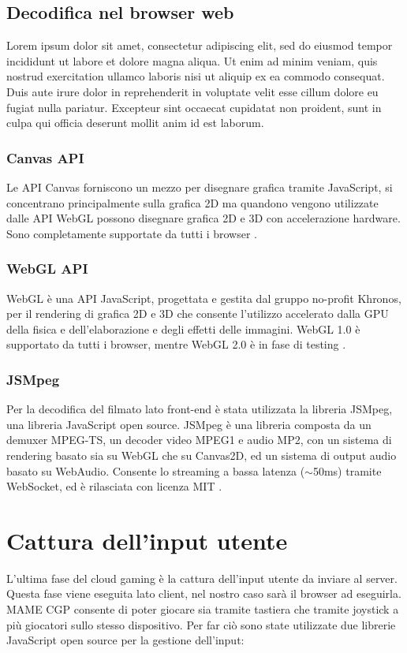 \subsection{Decodifica nel browser web}
Lorem ipsum dolor sit amet, consectetur adipiscing elit, sed do eiusmod tempor incididunt ut labore et dolore magna aliqua. Ut enim ad minim veniam, quis nostrud exercitation ullamco laboris nisi ut aliquip ex ea commodo consequat. Duis aute irure dolor in reprehenderit in voluptate velit esse cillum dolore eu fugiat nulla pariatur. Excepteur sint occaecat cupidatat non proident, sunt in culpa qui officia deserunt mollit anim id est laborum.

\subsubsection{Canvas API}
Le API Canvas forniscono un mezzo per disegnare grafica tramite JavaScript, si concentrano principalmente sulla grafica 2D ma quandono vengono utilizzate dalle API WebGL possono disegnare grafica 2D e 3D con accelerazione hardware. Sono completamente supportate da tutti i browser \parencite{Canvas_API}.

\subsubsection{WebGL API}
WebGL è una API JavaScript, progettata e gestita dal gruppo no-profit Khronos, per il rendering di grafica 2D e 3D che consente l'utilizzo accelerato dalla GPU della fisica e dell'elaborazione e degli effetti delle immagini. WebGL 1.0 è supportato da tutti i browser, mentre WebGL 2.0 è in fase di testing \parencite{WebGL}.

\subsubsection{JSMpeg} \label{subsec:cap3_JSMpeg}
Per la decodifica del filmato lato front-end è stata utilizzata la libreria JSMpeg, una libreria JavaScript open source. JSMpeg è una libreria composta da un demuxer MPEG-TS, un decoder video MPEG1 e audio MP2, con un sistema di rendering basato sia su WebGL che su Canvas2D, ed un sistema di output audio basato su WebAudio. Consente lo streaming a bassa latenza ($\sim$50ms) tramite WebSocket, ed è rilasciata con licenza MIT \parencite{JSMpeg}.




\section{Cattura dell'input utente}
L'ultima fase del cloud gaming è la cattura dell'input utente da inviare al server. Questa fase viene eseguita lato client, nel nostro caso sarà il browser ad eseguirla. MAME CGP consente di poter giocare sia tramite tastiera che tramite joystick a più giocatori sullo stesso dispositivo. Per far ciò sono state utilizzate due librerie JavaScript open source per la gestione dell'input:

